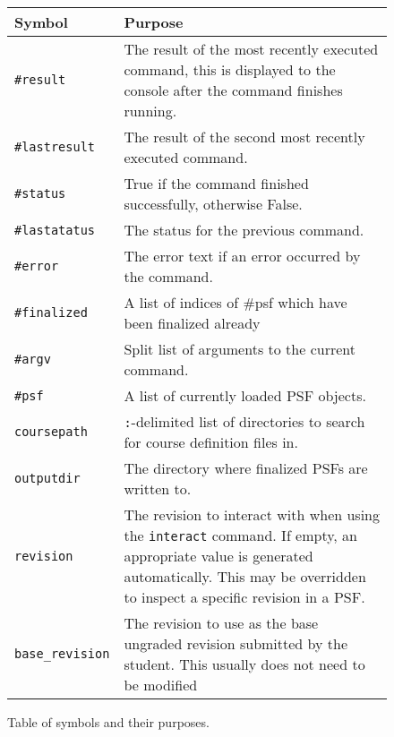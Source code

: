 \documentclass{book}
\begin{document}
\begin{figure}[H]

	\centering

	\begin{tabular}{p{} | p{}}

		Symbol & Purpose \\ \hline\hline

		\texttt{\#result} & The result of the most recently
		executed command, this is displayed to the console after the
		command finishes running. \\ \hline

		\texttt{\#lastresult} & The result of the second most recently
		executed command. \\ \hline

		\texttt{\#status} & True if the command finished successfully,
		otherwise False. \\ \hline

		\texttt{\#lastatatus} & The status for the previous command. \\
		\hline

		\texttt{\#error} & The error text if an error occurred by the
		command.  \\ \hline

		\texttt{\#finalized} & A list of indices of \#psf which have
		been finalized already \\ \hline

		\texttt{\#argv} & Split list of arguments to the current
		command. \\ \hline

		\texttt{\#psf} & A list of currently loaded PSF objects. \\
		\hline

		\texttt{coursepath} & \texttt{:}-delimited list of directories
		to search for course definition files in. \\ \hline

		\texttt{outputdir} & The directory where finalized PSFs are
		written to. \\ \hline

		\texttt{revision} & The revision to interact with when using
		the \texttt{interact} command. If empty, an appropriate value
		is generated automatically. This may be overridden to inspect
		a specific revision in a PSF. \\ \hline

		\texttt{base\_revision} & The revision to use as the base
		ungraded revision submitted by the student. This usually does
		not need to be modified \\

	\end{tabular}

	\caption{\label{fig:symtab} Table of symbols and their purposes.}

\end{figure}
\end{document}
